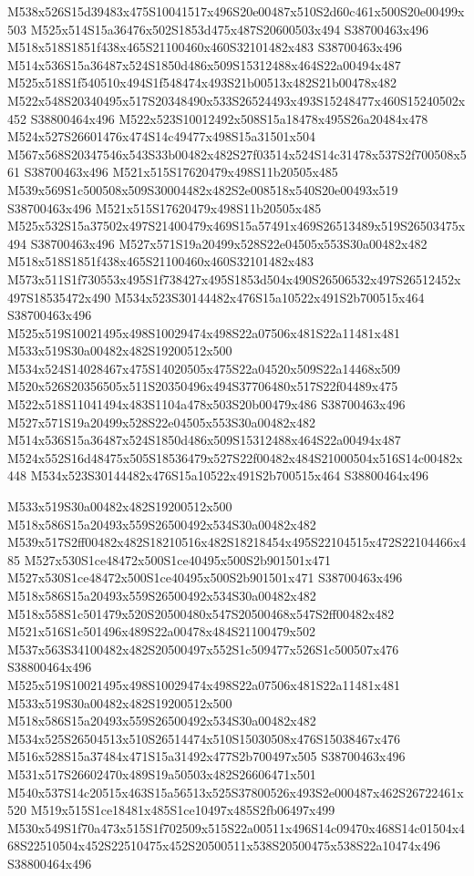 \documentclass{article}
\begin{document}
\begin{multicols}{2}
M538x526S15d39483x475S10041517x496S20e00487x510S2d60c461x500S20e00499x503 M525x514S15a36476x502S1853d475x487S20600503x494 S38700463x496 M518x518S1851f438x465S21100460x460S32101482x483 S38700463x496 M514x536S15a36487x524S1850d486x509S15312488x464S22a00494x487 M525x518S1f540510x494S1f548474x493S21b00513x482S21b00478x482 M522x548S20340495x517S20348490x533S26524493x493S15248477x460S15240502x452 S38800464x496 M522x523S10012492x508S15a18478x495S26a20484x478 M524x527S26601476x474S14c49477x498S15a31501x504 M567x568S20347546x543S33b00482x482S27f03514x524S14c31478x537S2f700508x561 S38700463x496 M521x515S17620479x498S11b20505x485 M539x569S1c500508x509S30004482x482S2e008518x540S20e00493x519 S38700463x496 M521x515S17620479x498S11b20505x485 M525x532S15a37502x497S21400479x469S15a57491x469S26513489x519S26503475x494 S38700463x496 M527x571S19a20499x528S22e04505x553S30a00482x482 M518x518S1851f438x465S21100460x460S32101482x483 M573x511S1f730553x495S1f738427x495S1853d504x490S26506532x497S26512452x497S18535472x490 M534x523S30144482x476S15a10522x491S2b700515x464 S38700463x496 M525x519S10021495x498S10029474x498S22a07506x481S22a11481x481 M533x519S30a00482x482S19200512x500 M534x524S14028467x475S14020505x475S22a04520x509S22a14468x509 M520x526S20356505x511S20350496x494S37706480x517S22f04489x475 M522x518S11041494x483S1104a478x503S20b00479x486 S38700463x496 M527x571S19a20499x528S22e04505x553S30a00482x482 M514x536S15a36487x524S1850d486x509S15312488x464S22a00494x487 M524x552S16d48475x505S18536479x527S22f00482x484S21000504x516S14c00482x448 M534x523S30144482x476S15a10522x491S2b700515x464 S38800464x496

M533x519S30a00482x482S19200512x500 M518x586S15a20493x559S26500492x534S30a00482x482 M539x517S2ff00482x482S18210516x482S18218454x495S22104515x472S22104466x485 M527x530S1ce48472x500S1ce40495x500S2b901501x471 M527x530S1ce48472x500S1ce40495x500S2b901501x471 S38700463x496 M518x586S15a20493x559S26500492x534S30a00482x482 M518x558S1c501479x520S20500480x547S20500468x547S2ff00482x482 M521x516S1c501496x489S22a00478x484S21100479x502 M537x563S34100482x482S20500497x552S1c509477x526S1c500507x476 S38800464x496 M525x519S10021495x498S10029474x498S22a07506x481S22a11481x481 M533x519S30a00482x482S19200512x500 M518x586S15a20493x559S26500492x534S30a00482x482 M534x525S26504513x510S26514474x510S15030508x476S15038467x476 M516x528S15a37484x471S15a31492x477S2b700497x505 S38700463x496 M531x517S26602470x489S19a50503x482S26606471x501 M540x537S14c20515x463S15a56513x525S37800526x493S2e000487x462S26722461x520 M519x515S1ce18481x485S1ce10497x485S2fb06497x499 M530x549S1f70a473x515S1f702509x515S22a00511x496S14c09470x468S14c01504x468S22510504x452S22510475x452S20500511x538S20500475x538S22a10474x496 S38800464x496


\end{multicols}
\end{document}
